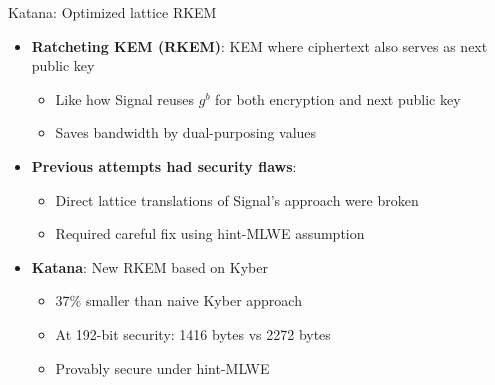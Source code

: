 \documentclass[aspectratio=169, lualatex, handout]{beamer}
\begin{document}
\begin{frame}{Katana: Optimized lattice RKEM}
	\begin{itemize}
		\item \textbf{Ratcheting KEM (RKEM)}: KEM where ciphertext also serves as next public key
		      \begin{itemize}
			      \item Like how Signal reuses $g^b$ for both encryption and next public key
			      \item Saves bandwidth by dual-purposing values
		      \end{itemize}
		\item \textbf{Previous attempts had security flaws}:
		      \begin{itemize}
			      \item Direct lattice translations of Signal's approach were broken
			      \item Required careful fix using hint-MLWE assumption
		      \end{itemize}
		\item \textbf{Katana}: New RKEM based on Kyber
		      \begin{itemize}
			      \item 37\% smaller than naive Kyber approach
			      \item At 192-bit security: 1416 bytes vs 2272 bytes
			      \item Provably secure under hint-MLWE
		      \end{itemize}
	\end{itemize}
\end{frame}
\end{document}
